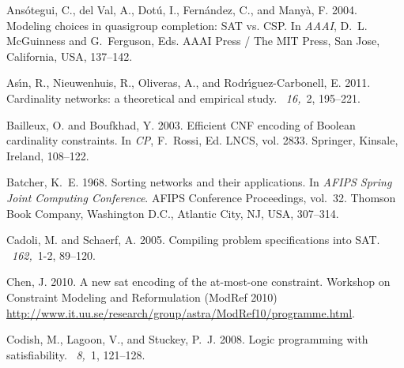\documentclass{tlp}
\begin{document}
\begin{thebibliography}{}

{\sc Ans{\'o}tegui, C.}, {\sc del Val, A.}, {\sc Dot{\'u}, I.}, {\sc
  Fern{\'a}ndez, C.}, {\sc and} {\sc Many{\`a}, F.} 2004.
\newblock Modeling choices in quasigroup completion: {SAT} vs. {CSP}.
\newblock In {\em AAAI}, {D.~L. McGuinness} {and} {G.~Ferguson}, Eds. AAAI
  Press / The MIT Press, San Jose, California, USA, 137--142.

{\sc As\'{\i}n, R.}, {\sc Nieuwenhuis, R.}, {\sc Oliveras, A.}, {\sc and} {\sc
  Rodr\'{\i}guez-Carbonell, E.} 2011.
\newblock Cardinality networks: a theoretical and empirical study.
~{\em 16,\/}~2, 195--221.

{\sc Bailleux, O.} {\sc and} {\sc Boufkhad, Y.} 2003.
\newblock Efficient {CNF} encoding of {B}oolean cardinality constraints.
\newblock In {\em CP}, {F.~Rossi}, Ed. LNCS, vol. 2833. Springer, Kinsale,
  Ireland, 108--122.

{\sc Batcher, K.~E.} 1968.
\newblock Sorting networks and their applications.
\newblock In {\em AFIPS Spring Joint Computing Conference}. AFIPS Conference
  Proceedings, vol.~32. Thomson Book Company, Washington D.C., Atlantic City,
  NJ, USA, 307--314.

{\sc Cadoli, M.} {\sc and} {\sc Schaerf, A.} 2005.
\newblock Compiling problem specifications into {SAT}.
~{\em 162,\/}~1-2, 89--120.

{\sc Chen, J.} 2010.
\newblock A new sat encoding of the at-most-one constraint.
\newblock Workshop on Constraint Modeling and Reformulation (ModRef 2010)
  \url{http://www.it.uu.se/research/group/astra/ModRef10/programme.html}.

{\sc Codish, M.}, {\sc Lagoon, V.}, {\sc and} {\sc Stuckey, P.~J.} 2008.
\newblock Logic programming with satisfiability.
~{\em 8,\/}~1, 121--128.


\end{thebibliography}
\end{document}
